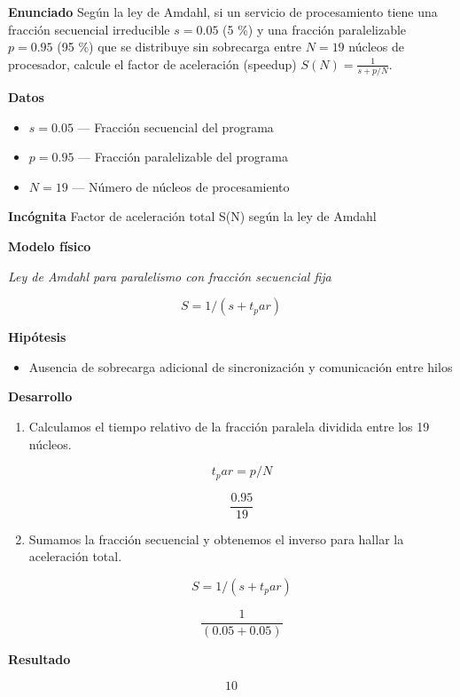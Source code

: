 \documentclass{book}
\begin{document}
\begin{tcolorbox}[title={Problema resuelto}, studiumworked, breakable]

\noindent\textbf{Enunciado}
Según la ley de Amdahl, si un servicio de procesamiento tiene una fracción secuencial irreducible \(s = 0.05\) (5 \%) y una fracción paralelizable \(p = 0.95\) (95 \%) que se distribuye sin sobrecarga entre \(N = 19\) núcleos de procesador, calcule el factor de aceleración (speedup) \(S(N) = \frac{1}{s + p/N}\).

\noindent\textbf{Datos}
\begin{itemize}
\item $s = 0.05$ — Fracción secuencial del programa
\item $p = 0.95$ — Fracción paralelizable del programa
\item $N = 19$ — Número de núcleos de procesamiento
\end{itemize}

\noindent\textbf{Incógnita}
Factor de aceleración total S(N) según la ley de Amdahl

\noindent\textbf{Modelo físico}

\noindent\textit{Ley de Amdahl para paralelismo con fracción secuencial fija}

\[
S = 1 / (s + t_par)
\]

\noindent\textbf{Hipótesis}
\begin{itemize}
\item Ausencia de sobrecarga adicional de sincronización y comunicación entre hilos
\end{itemize}

\noindent\textbf{Desarrollo}
\begin{enumerate}
\item
Calculamos el tiempo relativo de la fracción paralela dividida entre los 19 núcleos.

\[
t_par = p / N
\]

\[
\frac{0.95}{19}
\]
\item
Sumamos la fracción secuencial y obtenemos el inverso para hallar la aceleración total.

\[
S = 1 / (s + t_par)
\]

\[
\frac{1}{\left(0.05+0.05\right)}
\]
\end{enumerate}

\noindent\textbf{Resultado}

\[
10
\]


\end{tcolorbox}
\end{document}
